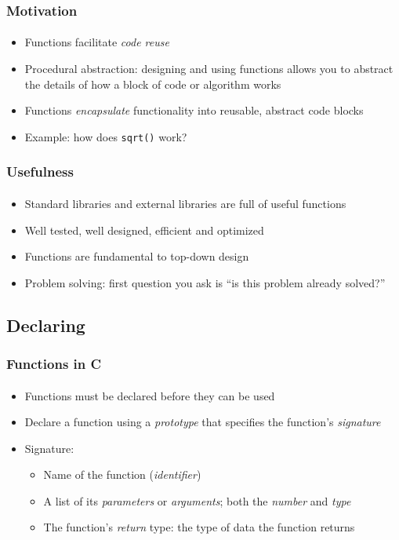 \documentclass[]{beamer}
\begin{document}
\begin{frame}
    \frametitle{Motivation}
    \framesubtitle{}

\begin{itemize}[<+->]
  \item Functions facilitate \emph{code reuse}
  \item Procedural abstraction: designing and using functions allows
  you to abstract the details of how a block of code or algorithm works
  \item Functions \emph{encapsulate} functionality into reusable, abstract code blocks
  \item Example: how does \texttt{sqrt()} work?
\end{itemize}    

\end{frame}

\begin{frame}
    \frametitle{Usefulness}
    \framesubtitle{}

\begin{itemize}[<+->]
  \item Standard libraries and external libraries are full of useful functions
  \item Well tested, well designed, efficient and optimized
  \item Functions are fundamental to top-down design
  \item Problem solving: first question you ask is ``is this problem already solved?''
\end{itemize}    

\end{frame}


\subsection{Declaring}

\begin{frame}[fragile]
    \frametitle{Functions in C}
    \framesubtitle{}

\begin{itemize}[<+->]
  \item Functions must be declared before they can be used
  \item Declare a function using a \emph{prototype} that specifies the
  function's \emph{signature}
  \item Signature:
  \begin{itemize}
    \item Name of the function (\emph{identifier})
    \item A list of its \emph{parameters} or \emph{arguments}; 
    both the \emph{number} and \emph{type}
    \item The function's \emph{return} type: the type of data the function returns
  \end{itemize}
\end{itemize}    

\end{frame}
\end{document}
